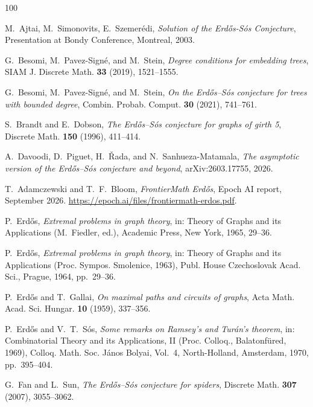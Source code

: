 \documentclass[11pt]{article}
\theoremstyle{remark}
\numberwithin{equation}{section}
\begin{document}
	\fi
	\begin{thebibliography}{100}
		
		 M.~Ajtai, M.~Simonovits, E.~Szemerédi, \emph{Solution of the Erd\H{o}s-S\'{o}s Conjecture}, Presentation at Bondy Conference, Montreal, 2003.
		
		 G.~Besomi, M.~Pavez-Sign{\'e}, and M.~Stein, \emph{Degree conditions for embedding trees}, SIAM J. Discrete Math. \textbf{33} (2019), 1521--1555. 
		
		 G.~Besomi, M.~Pavez-Sign{\'e}, and M.~Stein, \emph{On the Erd{\H{o}}s--S{\'o}s conjecture for trees with bounded degree}, Combin. Probab. Comput. \textbf{30} (2021), 741--761. 
		
		 S.~Brandt and E.~Dobson, \emph{The Erd{\H{o}}s--S{\'o}s conjecture for graphs of girth 5}, Discrete Math. \textbf{150} (1996), 411--414. 
		
		 A.~Davoodi, D.~Piguet, H.~\v{R}ada, and N.~Sanhueza-Matamala, \emph{The asymptotic version of the Erd{\H{o}}s--S{\'o}s conjecture and beyond}, arXiv:2603.17755, 2026. 
		
		
		T.~Adamczewski and T.~F.~Bloom,
		\emph{FrontierMath Erd\H{o}s}, Epoch AI report, September 2026.
		\url{https://epoch.ai/files/frontiermath-erdos.pdf}.
		
		P.~Erd\H{o}s,
		\emph{Extremal problems in graph theory},
		in: Theory of Graphs and its Applications (M.~Fiedler, ed.),
		Academic Press, New York, 1965, 29--36.
		
		 P.~Erd{\H{o}}s, \emph{Extremal problems in graph theory}, in: Theory of Graphs and its Applications (Proc. Sympos. Smolenice, 1963), Publ. House Czechoslovak Acad. Sci., Prague, 1964, pp.~29--36. 
		
		P.~Erd\H{o}s and T.~Gallai,
		\emph{On maximal paths and circuits of graphs},
		Acta Math. Acad. Sci. Hungar. \textbf{10} (1959), 337--356.
		
		 P.~Erd{\H{o}}s and V.~T.~S{\'o}s, \emph{Some remarks on Ramsey's and Tur{\'a}n's theorem}, in: Combinatorial Theory and its Applications, II (Proc. Colloq., Balatonf{\"u}red, 1969), Colloq. Math. Soc. J{\'a}nos Bolyai, Vol.~4, North-Holland, Amsterdam, 1970, pp.~395--404.
		
		 G.~Fan and L.~Sun, \emph{The Erd{\H{o}}s--S{\'o}s conjecture for spiders}, Discrete Math. \textbf{307} (2007), 3055--3062. 
		

\end{thebibliography}
\end{document}
